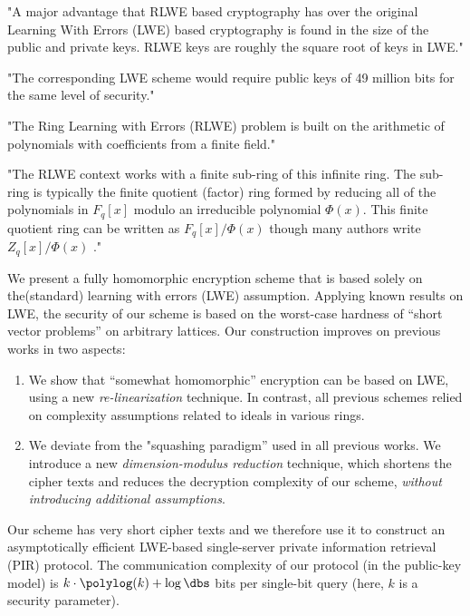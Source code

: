 "A major advantage that RLWE based cryptography has over the original Learning With Errors (LWE) based cryptography is found in the size of the public and private keys. RLWE keys are roughly the square root of keys in LWE."

"The corresponding LWE scheme would require public keys of 49 million bits for the same level of security."

"The Ring Learning with Errors (RLWE) problem is built on the arithmetic of polynomials with coefficients from a finite field."

"The RLWE context works with a finite sub-ring of this infinite ring. The sub-ring is typically the finite quotient (factor) ring formed by reducing all of the polynomials in $ F_{q}[x] $ modulo an irreducible polynomial $ \Phi (x) $. This finite quotient ring can be written as $ F_{q}[x]/\Phi (x) $ though many authors write $ Z_{q}[x]/\Phi (x) $ ."

We present a fully homomorphic encryption scheme that is based solely on the(standard) learning with errors (LWE) assumption. Applying known results on LWE, the security of our scheme is based on the worst-case hardness of ``short vector problems'' on arbitrary lattices. Our construction improves on previous works in two aspects:\begin{enumerate}\item We show that ``somewhat homomorphic'' encryption can be based on LWE, using a new {\em re-linearization} technique. In contrast, all previous schemes relied on complexity assumptions related to ideals in various rings. \item We deviate from the "squashing paradigm'' used in all previous works. We introduce a new {\em dimension-modulus reduction} technique, which shortens the cipher texts and reduces the decryption complexity of our scheme, {\em without introducing additional assumptions}. \end{enumerate}Our scheme has very short cipher texts and we therefore use it to construct an asymptotically efficient LWE-based single-server private information retrieval (PIR) protocol. The communication complexity of our protocol (in the public-key model) is $k \cdot \polylog(k)+\log \dbs$ bits per single-bit query (here, $k$ is a security parameter).